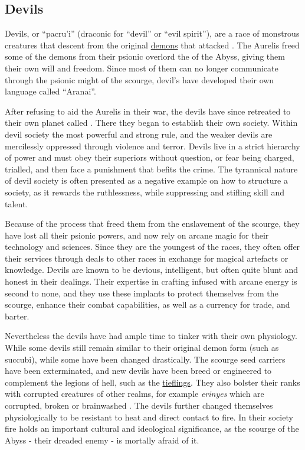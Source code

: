 \subsection{Devils}
\label{sec:Devils}

Devils, or ``pacru'i'' (draconic for ``devil'' or ``evil spirit''), are a race
of monstrous creatures that descent from the original
\hyperref[sec:Demons]{demons} that attacked . The Aurelis
freed some of the demons from their psionic overlord the 
of the Abyss, giving them their own will and freedom. Since most of them can
no longer communicate through the psionic might of the scourge, devil's have
developed their own language called ``Aranai''.

After refusing to aid the Aurelis in their war, the devils have since
retreated to their own planet called . There they began to
establish their own society. Within devil society the most powerful and strong
rule, and the weaker devils are mercilessly oppressed through violence and
terror. Devils live in a strict hierarchy of power and must obey their superiors
without question, or fear being charged, trialled, and then face a punishment
that befits the crime. The tyrannical nature of devil society is often
presented as a negative example on how to structure a society, as it rewards
the ruthlessness, while suppressing and stifling skill and talent.

Because of the process that freed them from the enslavement of the scourge,
they have lost all their psionic powers, and now rely on arcane magic for
their technology and sciences. Since they are the youngest of the races, they
often offer their services through deals to other races in exchange for
magical artefacts or knowledge. Devils are known to be devious, intelligent,
but often quite blunt and honest in their dealings. Their expertise in crafting
 infused with arcane energy is second to none, and they
use these implants to protect themselves from the scourge, enhance their
combat capabilities, as well as a currency for trade, and barter.

Nevertheless the devils have had ample time to tinker with their own
physiology. While some devils still remain similar to their original demon
form (such as succubi), while some have been changed drastically. The scourge
seed carriers have been exterminated, and new devils have been breed or
engineered to complement the legions of hell, such as the
\hyperref[sec:Tieflings]{tieflings}. They also bolster their ranks with
corrupted creatures of other realms, for example \emph{erinyes} which are
corrupted, broken or brainwashed . The devils further
changed themselves physiologically to be resistant to heat and direct contact
to fire. In their society fire holds an important cultural and ideological
significance, as the scourge of the Abyss - their dreaded enemy - is mortally
afraid of it.

